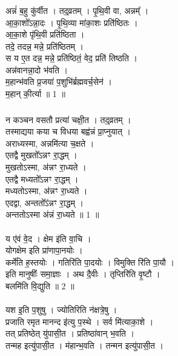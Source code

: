 \subsubsection{}
अन्नं॑ ब॒हु कु॑र्वीत । तद्॒व्रतम् । पृ॒थि॒वी वा, अन्नम्᳚ ।\\
आ॒का॒शो᳚ऽन्ना॒दः । पृ॒थि॒व्या मा॑का॒शः प्रति॑ष्ठितः ।\\
आ॒का॒शे पृ॑थि॒वी प्रति॑ष्ठिता ।\\
तदे॒ तदन्न॒ मन्ने॒ प्रति॑ष्ठितम् ।\\
स य ए॒त दन्न॒ मन्ने॒ प्रति॑ष्ठितं॒ वेद॒ प्रति॑ तिष्ठति ।\\
अन्न॑वानन्ना॒दो भ॑वति । \\
म॒हान्भ॑वति प्र॒जया॑ प॒शुभि॑र्ब्रह्मवर्च॒सेन॑ । \\
म॒हान् की॒र्त्या ॥ 1 ॥\\
\subsubsection{}
न कञ्चन वसतौ प्रत्या॑ चक्षी॒त । तद्॒व्रतम् ।\\
तस्माद्यया कया च विधया बह्व॑न्नं प्रा॒प्नुयात् ।\\
अराध्यस्मा, अन्नमि॑त्या च॒क्षते ।\\
एतद्वै मुखतो᳚ऽन्नꣳ रा॒द्धम् ।\\
मुखतोऽस्मा, अ॑न्नꣳ रा॒ध्यते ।\\
एतद्वै मध्यतो᳚ऽन्नꣳ रा॒द्धम् ।\\
मध्यतोऽस्मा, अ॑न्नꣳ रा॒ध्यते ।\\
एदद्वा, अन्ततो᳚ऽ॑न्नꣳ रा॒द्धम् ।\\
अन्ततोऽस्मा अ॑न्नं रा॒ध्यते ॥ 1 ॥\\
\\
य ए॑वं वे॒द । क्षेम इ॑ति वा॒चि । \\
योगक्षेम इति प्रा॑णापा॒नयोः ।\\
कर्मे॑ति ह॒स्तयोः । गतिरि॑ति पा॒दयोः । विमुक्ति रि॑ति पा॒यौ ।\\
इति मानुषीः᳚ समा॒ज्ञाः । अथ दै॒वीः । तृप्तिरि॑ति वृ॒ष्टौ ।\\
बलमि॑ति वि॒द्युति ॥ 2 ॥\\
\\
यश इ॒ति प॒शुषु । ज्योतिरिति न॑क्षत्रे॒षु ।\\
प्रजाति रमृत मानन्द इ॑त्यु प॒स्थे । सर्व मि॑त्याका॒शे ।\\
तत् प्रतिष्ठेत् यु॑पासी॒त । प्रतिष्ठा॑वान् भ॒वति ।\\
तन्मह इत्यु॑पासी॒त । म॑हान्भ॒वति । तन्मन इत्यु॑पासी॒त ।\\
